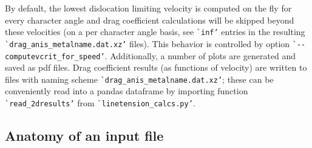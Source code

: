 \documentclass[11pt,letterpaper,oneside,pdftex]{article}
\begin{document}
By default, the lowest dislocation limiting velocity is computed on the fly for every character angle and drag coefficient calculations will be skipped beyond these velocities (on a per character angle basis, see \verb|`inf’| entries in the resulting \verb|`drag_anis_metalname.dat.xz’| files).
This behavior is controlled by option \verb|`--computevcrit_for_speed’|.
Additionally, a number of plots are generated and saved as pdf files.
Drag coefficient results (as functions of velocity) are written to files with naming scheme \verb|`drag_anis_metalname.dat.xz’|;
these can be conveniently read into a pandas dataframe by importing function \verb|`read_2dresults’| from \verb|`linetension_calcs.py’|.




\subsection{Anatomy of an input file}
\label{sec:inputfiles}
\end{document}
